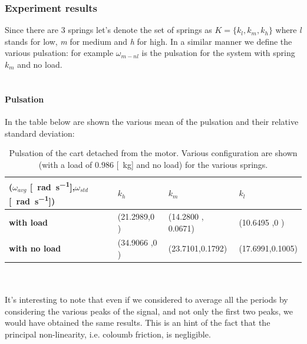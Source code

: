 \subsubsection{Experiment results}
Since there are $3$ springs let's denote the set of springs as $K=\{k_l, k_m, k_h\}$ where \emph{l} stands for low, \emph{m} for medium and \emph{h} for high. In a similar manner we define the various pulsation: for example $\omega_{m-nl}$ is the pulsation for the system with spring $k_m$ and no load.
\\ \\ 
\paragraph{Pulsation}
In the table below are shown the various mean of the pulsation and their relative standard deviation:
\begin{table}[!h]
\centering

\label{table: cart_detached_omega}
\begin{tabular}{|l|l|l|l|}
\hline
{(\textbf{$\omega_{avg}$} [\SI{}{\radian \per \second}],$\omega_{std}$ [\SI{}{\radian \per \second}])} & \textbf{$k_h$} & \textbf{$k_m$}   & \textbf{$k_l$}   \\ \hline
\textbf{with load}         & (21.2989,0 )    & (14.2800 ,    0.0671) & (10.6495 ,0 )      \\ \hline
\textbf{with no load}      & (34.9066 ,0 )    & (23.7101,0.1792) & (17.6991,0.1005) \\ \hline
\end{tabular}
\caption{Pulsation of the cart detached from the motor. Various configuration are shown (with a load of $0.986$ [\SI{}{\kilo \gram}] and no load) for the various springs. }
\end{table} \\ \\
It's interesting to note that even if we considered to average all the periods by considering the various peaks of the signal, and not only the first two peaks, we would have obtained the same results. This is an hint of the fact that the principal non-linearity, i.e. coloumb friction, is negligible.

